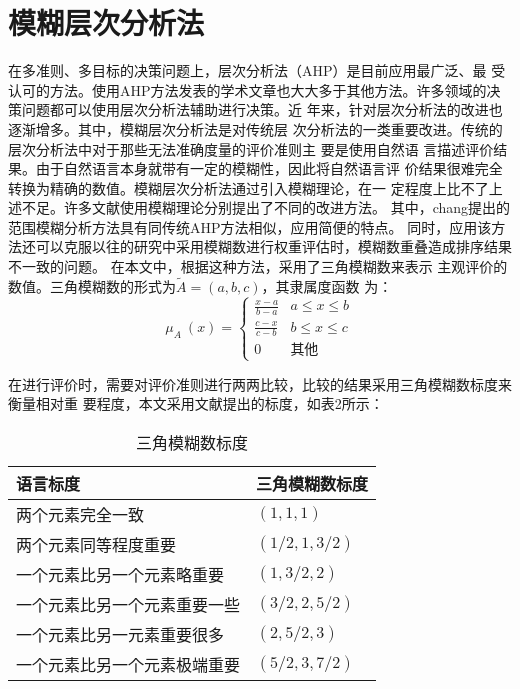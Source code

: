 \documentclass[adobefonts,UTF8]{ctexart}
\begin{document}
  \section{模糊层次分析法}

  在多准则、多目标的决策问题上，层次分析法（AHP）是目前应用最广泛、最
  受认可的方法\cite{Wallenius2008}。使用AHP方法发表的学术文章也大大多于其他方法。许多领域的决策问题都可以使用层次分析法辅助进行决策。近
  年来，针对层次分析法的改进也逐渐增多。其中，模糊层次分析法是对传统层
  次分析法的一类重要改进。传统的层次分析法中对于那些无法准确度量的评价准则主
  要是使用自然语
  言描述评价结果。由于自然语言本身就带有一定的模糊性，因此将自然语言评
  价结果很难完全转换为精确的数值。模糊层次分析法通过引入模糊理论，在一
  定程度上比不了上述不足。许多文献使用模糊理论分别提出了不同的改进方法\cite{buckley2001fuzzy,cheng1997evaluating,chang1996applications}。
  其中，chang\cite{chang1996applications}提出的范围模糊分析方法具有同传统AHP方法相似，应用简便的特点。 同时，应用该方法还可以克服以往的研究中采用模糊数进行权重评估时，模糊数重叠造成排序结果不一致的问题\cite{chen1997efficient}。
  在本文中，根据这种方法，采用了三角模糊数来表示
  主观评价的数值。三角模糊数的形式为$\tilde{A}=(a,b,c)$，其隶属度函数
  为：
  \[
  \mu_A~(x)=
  \left\{
      \begin{array}{ll}
        \frac{x-a}{b-a}&a\leq x \leq b\\
        \frac{c-x}{c-b}&b \leq x \leq c\\
        0 &　 \text{其他}
      \end{array}
    \right.
\]

在进行评价时，需要对评价准则进行两两比较，比较的结果采用三角模糊数标度来衡量相对重
要程度，本文采用文献\cite{Lee2009}提出的标度，如表2所示：
\begin{table}[hbt]
  \centering
 \caption{三角模糊数标度}
  \begin{tabular}{ll}
    语言标度&三角模糊数标度\\\hline
    两个元素完全一致&$(1,1,1)$\\
    两个元素同等程度重要&$(1/2,1,3/2)$\\
    一个元素比另一个元素略重要&$(1,3/2,2)$\\
    一个元素比另一个元素重要一些&$(3/2,2,5/2)$\\
    一个元素比另一元素重要很多&$(2,5/2,3)$\\
    一个元素比另一个元素极端重要&$(5/2,3,7/2)$\\
  \end{tabular}
 
\end{table}
\end{document}
